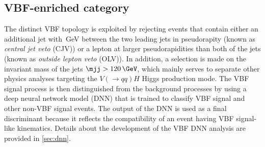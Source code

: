 


\subsection{VBF-enriched \TwoJet category}
\label{subsec:vbf-category}
The distinct VBF topology is exploited by rejecting events that contain either an additional jet with \,GeV between the two leading jets in pseudorapity (known as \emph{central jet veto} (CJV)) or a lepton at larger pseudorapidities than both of the jets (known as \emph{outside lepton veto} (OLV)).
In addition, a selection is made on the invariant mass of the jets $\mjj > 120\,\GeV$, which mainly serves to separate other physics analyses targeting the $V(\to qq)H$ Higgs production mode.
The VBF signal process is then distinguished from the background processes by using a deep neural network model (DNN) that is trained to classify VBF signal and other non-VBF signal events.
The output of the DNN is used as a final discriminant because it reflects the compatibility of an event having VBF signal-like kinematics. Details about the development of the VBF DNN analysis are provided in \cref{sec:dnn}.


